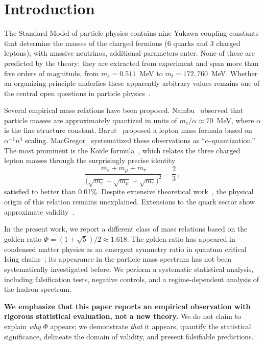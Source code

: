\documentclass[11pt,a4paper]{article}
\begin{document}
\section{Introduction}
\label{sec:intro}

The Standard Model of particle physics contains nine Yukawa coupling
constants that determine the masses of the charged fermions
(6 quarks and 3 charged leptons); with massive neutrinos, additional
parameters enter. None of these are predicted by the theory; they are
extracted from experiment and span more than five orders of magnitude,
from $m_e = 0.511$~MeV to $m_t = 172{,}760$~MeV. Whether an organizing
principle underlies these apparently arbitrary values remains one of
the central open questions in particle physics~\cite{Xing2020,Fritzsch2000}.

Several empirical mass relations have been proposed. Nambu~\cite{Nambu1952}
observed that particle masses are approximately quantized in units of
$m_e / \alpha \approx 70$~MeV, where $\alpha$ is the fine structure
constant. Barut~\cite{Barut1979} proposed a lepton mass formula
based on $\alpha^{-1} n^4$ scaling. MacGregor~\cite{MacGregor2007}
systematized these observations as ``$\alpha$-quantization.'' The most
prominent is the Koide formula~\cite{Koide1982}, which relates the
three charged lepton masses through the surprisingly precise identity
\begin{equation}
  \frac{m_e + m_\mu + m_\tau}
       {\bigl(\sqrt{m_e} + \sqrt{m_\mu} + \sqrt{m_\tau}\bigr)^2}
  = \frac{2}{3}\,,
  \label{eq:koide}
\end{equation}
satisfied to better than 0.01\%. Despite extensive theoretical
work~\cite{Sumino2009,GaoLi2016,Sun2021,RiveroGsponer2005,Foot1994},
the physical
origin of this relation remains unexplained. Extensions to the quark
sector show approximate validity~\cite{GaoLi2016}.

In the present work, we report a different class of mass relations
based on the golden ratio $\Phi = (1{+}\sqrt{5})/2 \approx 1.618$.
The golden ratio has appeared in condensed matter physics as an
emergent symmetry ratio in quantum critical Ising
chains~\cite{Coldea2010}; its appearance in the particle mass
spectrum has not been systematically investigated before.
We perform a systematic statistical analysis, including falsification
tests, negative controls, and a regime-dependent analysis of the
hadron spectrum.

\textbf{We emphasize that this paper reports an empirical observation
with rigorous statistical evaluation, not a new theory.} We do not
claim to explain \emph{why} $\Phi$ appears; we demonstrate
\emph{that} it appears, quantify the statistical significance,
delineate the domain of validity, and present falsifiable predictions.
\end{document}
